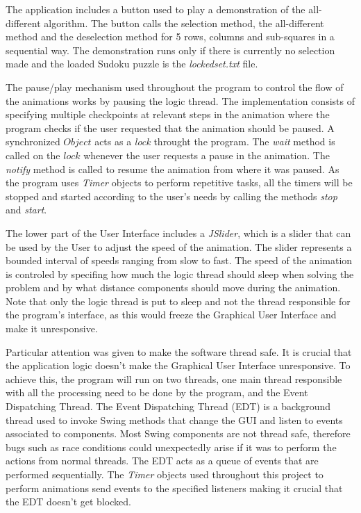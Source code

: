 \documentclass{l4proj}
\begin{document}
\noindent The application includes a button used to play a demonstration of the all-different algorithm. The button calls the selection method, the all-different method and the deselection method for 5 rows, columns and sub-squares in a sequential way. The demonstration runs only if there is currently no selection made and the loaded Sudoku puzzle is the \textit{lockedset.txt} file.

\noindent The pause/play mechanism used throughout the program to control the flow of the animations works by pausing the logic thread. The implementation consists of specifying multiple checkpoints at relevant steps in the animation where the program checks if the user requested that the animation should be paused. A synchronized $Object$ acts as a \textit{lock} throught the program. The \textit{wait} method is called on the $lock$ whenever the user requests a pause in the animation. The \textit{notify} method is called to resume the animation from where it was paused. As the program uses \textit{Timer} objects to perform repetitive tasks, all the timers will be stopped and started according to the user's needs by calling the methods \textit{stop} and \textit{start}.

\noindent The lower part of the User Interface includes a \textit{JSlider}, which is a slider that can be used by the User to adjust the speed of the animation. The slider represents a bounded interval of speeds ranging from slow to fast. The speed of the animation is controled by specifing how much the logic thread should sleep when solving the problem and by what distance components should move during the animation. Note that only the logic thread is put to sleep and not the thread responsible for the program's interface, as this would freeze the Graphical User Interface and make it unresponsive.

\noindent Particular attention was given to make the software thread safe. It is crucial that the application logic doesn’t make the Graphical User Interface unresponsive. To achieve this, the program will run on two threads, one main thread responsible with all the processing need to be done by the program, and the Event Dispatching Thread. The Event Dispatching Thread (EDT) is a background thread used to invoke Swing methods that change the GUI and listen to events associated to components. Most Swing components are not thread safe, therefore bugs such as race conditions could unexpectedly arise if it was to perform the actions from normal threads. The EDT acts as a queue of events that are performed sequentially. The \textit{Timer} objects used throughout this project to perform animations send events to the specified listeners making it crucial that the EDT doesn't get blocked.
\end{document}

